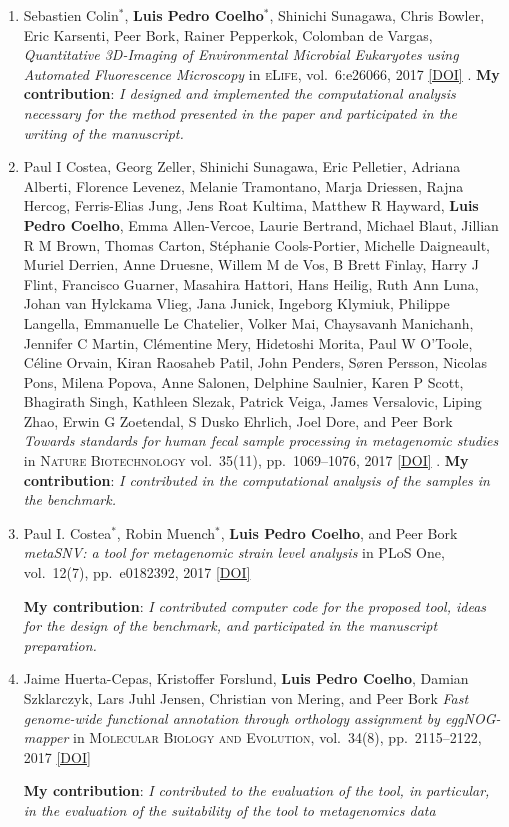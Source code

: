 \documentclass{article}
\newcommand\showdoi[1]{%
    \href{http://dx.doi.org/#1}{[DOI]}%
}
\newcommand\pubname[1]{\textsc{#1}}
\newcommand\contribution[1]{\relax\hfill\break\textbf{My contribution}: \textit{#1}}
\newcommand\costar{${}^{*}$}
\begin{document}
\begin{enumerate}[resume]
\item Sebastien Colin\costar, \textbf{Luis Pedro Coelho}\costar, Shinichi
Sunagawa, Chris Bowler, Eric Karsenti, Peer Bork, Rainer Pepperkok, Colomban de
Vargas, \emph{Quantitative 3D-Imaging of Environmental Microbial Eukaryotes
using Automated Fluorescence Microscopy} in \pubname{eLife}, vol.\ 6:e26066,
2017 \showdoi{10.7554/eLife.26066.001}.
\contribution{I designed and implemented the computational analysis necessary
for the method presented in the paper and participated in the writing of the
manuscript.}

\item Paul I Costea, Georg Zeller, Shinichi Sunagawa, Eric Pelletier, Adriana
Alberti, Florence Levenez, Melanie Tramontano, Marja Driessen, Rajna Hercog,
Ferris-Elias Jung, Jens Roat Kultima, Matthew R Hayward, \textbf{Luis Pedro
Coelho}, Emma Allen-Vercoe, Laurie Bertrand, Michael Blaut, Jillian R M Brown,
Thomas Carton, Stéphanie Cools-Portier, Michelle Daigneault, Muriel Derrien,
Anne Druesne, Willem M de Vos, B Brett Finlay, Harry J Flint, Francisco
Guarner, Masahira Hattori, Hans Heilig, Ruth Ann Luna, Johan van Hylckama
Vlieg, Jana Junick, Ingeborg Klymiuk, Philippe Langella, Emmanuelle Le
Chatelier, Volker Mai, Chaysavanh Manichanh, Jennifer C Martin, Clémentine
Mery, Hidetoshi Morita, Paul W O'Toole, Céline Orvain, Kiran Raosaheb Patil,
John Penders, Søren Persson, Nicolas Pons, Milena Popova, Anne Salonen,
Delphine Saulnier, Karen P Scott, Bhagirath Singh, Kathleen Slezak, Patrick
Veiga, James Versalovic, Liping Zhao, Erwin G Zoetendal, S Dusko Ehrlich, Joel
Dore, and Peer Bork \emph{Towards standards for human fecal sample processing
in metagenomic studies} in \pubname{Nature Biotechnology} vol.\ 35(11), pp.\
1069--1076, 2017 \showdoi{10.1038/nbt.3960}.
\contribution{I contributed in the computational analysis of the samples in the
benchmark.}

\item Paul I. Costea\costar, Robin Muench\costar, \textbf{Luis Pedro Coelho},
and Peer Bork \emph{metaSNV: a tool for metagenomic strain level analysis} in
PLoS One, vol.\ 12(7), pp.\ e0182392, 2017
\showdoi{10.1371/journal.pone.0182392}
\contribution{I contributed computer code for the proposed tool, ideas for the
design of the benchmark, and participated in the manuscript preparation.}

\item Jaime Huerta-Cepas, Kristoffer Forslund, \textbf{Luis Pedro Coelho},
Damian Szklarczyk, Lars Juhl Jensen, Christian von Mering, and Peer Bork
\emph{Fast genome-wide functional annotation through orthology assignment by
eggNOG-mapper} in \pubname{Molecular Biology and Evolution}, vol.\ 34(8), pp.\
2115--2122, 2017 \showdoi{10.1093/molbev/msx148}
\contribution{I contributed to the evaluation of the tool, in particular, in
the evaluation of the suitability of the tool to metagenomics data}


\end{enumerate}
\end{document}
